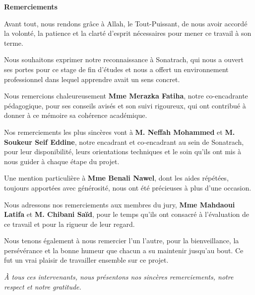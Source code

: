 \begin{titlepage}
\thispagestyle{empty}
\centering

\textbf{\Huge{\textcolor{bleu}{Remerciements}}}\\[2em]

\begin{flushleft}
\large\itshape

\medskip
\quad Avant tout, nous rendons grâce à Allah, le Tout-Puissant, de nous avoir accordé la volonté, la patience et la clarté d'esprit nécessaires pour mener ce travail à son terme.

\bigskip\medskip
\quad Nous souhaitons exprimer notre reconnaissance à Sonatrach, qui nous a ouvert ses portes pour ce stage de fin d'études et nous a offert un environnement professionnel dans lequel apprendre avait un sens concret.

\bigskip\medskip
\quad Nous remercions chaleureusement \textbf{Mme Merazka Fatiha}, notre co-encadrante pédagogique, pour ses conseils avisés et son suivi rigoureux, qui ont contribué à donner à ce mémoire sa cohérence académique.

\bigskip\medskip
\quad Nos remerciements les plus sincères vont à \textbf{M. Neffah Mohammed} et \textbf{M. Soukeur Seif Eddine}, notre encadrant et co-encadrant au sein de Sonatrach, pour leur disponibilité, leurs orientations techniques et le soin qu'ils ont mis à nous guider à chaque étape du projet.

\bigskip\medskip
\quad Une mention particulière à \textbf{Mme Benali Nawel}, dont les aides répétées, toujours apportées avec générosité, nous ont été précieuses à plus d'une occasion.

\bigskip\medskip
\quad Nous adressons nos remerciements aux membres du jury, \textbf{Mme Mahdaoui Latifa} et \textbf{M. Chibani Saïd}, pour le temps qu'ils ont consacré à l'évaluation de ce travail et pour la rigueur de leur regard.

\bigskip\medskip
\quad Nous tenons également à nous remercier l'un l'autre, pour la bienveillance, la persévérance et la bonne humeur que chacun a su maintenir jusqu'au bout. Ce fut un vrai plaisir de travailler ensemble sur ce projet.
\end{flushleft}

\bigskip\bigskip

\begin{center}
\large\itshape
À tous ces intervenants, nous présentons nos sincères remerciements, notre respect et notre gratitude.
\end{center}

\end{titlepage}

